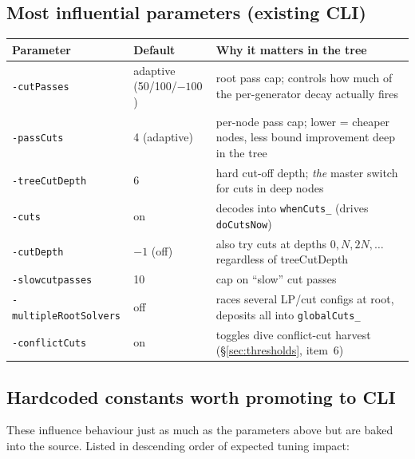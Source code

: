 \documentclass[11pt,a4paper]{article}
\begin{document}
\subsection*{Most influential parameters (existing CLI)}

\begin{longtable}{p{3.6cm}p{3.0cm}p{8.0cm}}
\toprule
\textbf{Parameter} & \textbf{Default} & \textbf{Why it matters in the tree}\\
\midrule
\endhead
\texttt{-cutPasses}       & adaptive (50/100/$-100$) & root pass cap; controls how much of the per-generator decay actually fires\\
\texttt{-passCuts}        & 4 (adaptive)             & per-node pass cap; lower = cheaper nodes, less bound improvement deep in the tree\\
\texttt{-treeCutDepth}    & 6                         & hard cut-off depth; \emph{the} master switch for cuts in deep nodes\\
\texttt{-cuts}            & on                        & decodes into \texttt{whenCuts\_} (drives \texttt{doCutsNow})\\
\texttt{-cutDepth}        & $-1$ (off)                & also try cuts at depths $0,N,2N,\dots$ regardless of treeCutDepth\\
\texttt{-slowcutpasses}   & 10                        & cap on ``slow'' cut passes\\
\texttt{-multipleRootSolvers} & off                   & races several LP/cut configs at root, deposits all into \texttt{globalCuts\_}\\
\texttt{-conflictCuts}    & on                        & toggles dive conflict-cut harvest (\S\ref{sec:thresholds}, item~6)\\
\bottomrule
\end{longtable}

\subsection*{Hardcoded constants worth promoting to CLI}

These influence behaviour just as much as the parameters above but
are baked into the source.  Listed in descending order of expected
tuning impact:
\end{document}
